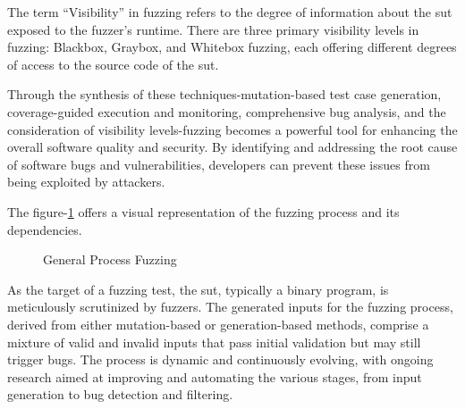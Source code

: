 The term ``Visibility'' in fuzzing refers to the degree of information about the
\acrshort{sut} exposed to the fuzzer's runtime. There are three primary visibility levels in
fuzzing: Blackbox\cite{godefroid2007random}\cite{manes2019art},
Graybox\cite{canakci2021directfuzz}\cite{li2018fuzzing}, and
Whitebox\cite{godefroid2008automated}\cite{godefroid2007random}\cite{godefroid2008grammar} fuzzing,
each offering different degrees of access to the source code of the \acrshort{sut}.

Through the synthesis of these techniques-mutation-based\cite{lyu2022ems}\cite{miller2007analysis}
test case generation, coverage-guided\cite{jaaskela2016genetic} execution and monitoring, comprehensive bug analysis,
and the consideration of visibility levels-fuzzing becomes a powerful tool
for enhancing the overall software quality and security. By identifying and
addressing the root cause of software bugs and vulnerabilities, developers
can prevent these issues from being exploited by attackers.

The figure-\ref{fig:general_process_fuzzing} offers a visual representation of the
fuzzing process and its dependencies.



\begin{figure}[h]
        \centering
        \caption{General Process Fuzzing\cite{liang2018fuzzing}}\label{fig:general_process_fuzzing}
\end{figure}

As the target of a fuzzing test, the \acrshort{sut}, typically a binary program,
is meticulously scrutinized by fuzzers. The generated inputs for the fuzzing process,
derived from either mutation-based or generation-based methods, comprise a mixture of valid and
invalid inputs that pass initial validation but may still trigger bugs. The process is dynamic
and continuously evolving, with ongoing research aimed at improving and automating the various
stages, from input generation to bug detection and filtering.


